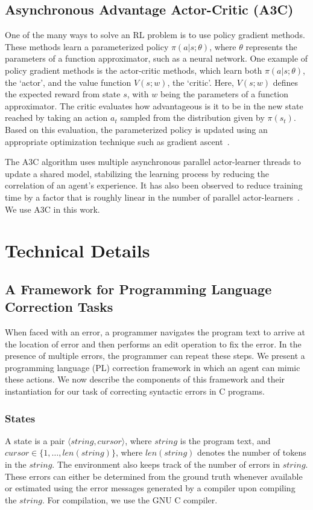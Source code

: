 \documentclass{article}
\begin{document}
\subsection{Asynchronous Advantage Actor-Critic (A3C)}
One of the many ways to solve an RL problem is to use policy gradient methods.
These methods learn a parameterized policy $ \pi(a|s; \theta) $, where $ \theta $ represents the parameters of a function approximator, such as a neural network.
One example of policy gradient methods is the actor-critic methods, which learn both $ \pi(a|s; \theta) $, the `actor', and the value function $ V(s; w) $, the `critic'.
Here, $ V(s; w) $ defines the expected reward from state $ s $, with $ w $ being the parameters of a function approximator. 
The critic evaluates how advantageous is it to be in the new state reached by taking an action $ a_t $ sampled from the distribution given by $ \pi(s_t) $.
Based on this evaluation, the parameterized policy is updated using an appropriate optimization technique such as gradient ascent~\cite{sutton1998reinforcement}.

The A3C algorithm uses multiple asynchronous parallel actor-learner threads to update a shared model, stabilizing the learning process by reducing the correlation of an agent's experience.
It has also been observed to reduce training time by a factor that is roughly linear in the number of parallel actor-learners~\cite{mnih2016asynchronous}.
We use A3C in this work.
 \section{Technical Details}

\subsection{A Framework for Programming Language Correction Tasks}
When faced with an error,
a programmer navigates the program text to arrive at the location of error and then performs an edit operation to fix the error.
In the presence of multiple errors, the programmer can repeat these steps.
We present a programming language (PL) correction framework in which an agent can mimic these actions.
We now describe the components of this framework and their instantiation for our task of
correcting syntactic errors in C programs.

\subsubsection{States}
A state is a pair $\langle string, cursor \rangle$, where $ string $ is the program text, and $ cursor \in \{ 1, \ldots, len(string) \} $, where $ len(string) $ denotes the number of tokens in the $ string $.
The environment also keeps track of the number of errors in $ string $.
These errors can either be determined from the ground truth whenever available or estimated using the error messages generated by a compiler upon compiling the $string$.
For compilation, we use the GNU C compiler.
	
\end{document}
